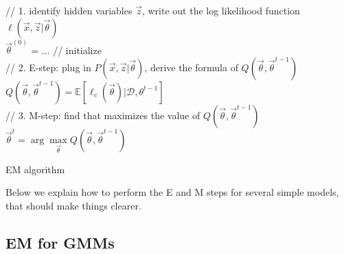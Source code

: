 \begin{algorithm}[htbp]

	// 1. identify hidden variables $\vec{z}$, write out the log likelihood function $\ell(\vec{x},\vec{z}|\vec{\theta})$ \\
	$\vec{\theta}^{(0)}$ = ... // initialize \\
	
	 {
	    // 2. E-step: plug in $P(\vec{x},\vec{z}|\vec{\theta})$, derive the formula of $Q(\vec{\theta}, \vec{\theta}^{t-1})$ \\
	    $Q(\vec{\theta}, \vec{\theta}^{t-1})=\mathbb{E}\left[\ell_c(\vec{\theta})| \mathcal{D},\theta^{t-1}\right]$ \\
	    // 3. M-step: find \vec{\theta} that maximizes the value of $Q(\vec{\theta}, \vec{\theta}^{t-1})$ \\
		$\vec{\theta}^t=\arg\max\limits_{\vec{\theta}} Q(\vec{\theta}, \vec{\theta}^{t-1})$ \\
	}
	
\caption{EM algorithm}
\end{algorithm}

Below we explain how to perform the E and M steps for several simple models, that should make things clearer.


\subsection{EM for GMMs}

